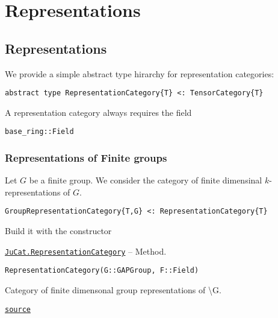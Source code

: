\documentclass{memoir}
\begin{document}
\chapter{Representations}




\hypertarget{5231629623898793339}{}


\section{Representations}



We provide a simple abstract type hirarchy for representation categories:




\begin{lstlisting}
abstract type RepresentationCategory{T} <: TensorCategory{T}
\end{lstlisting}



A representation category always requires the field




\begin{lstlisting}
base_ring::Field
\end{lstlisting}



\hypertarget{9324066174772501507}{}


\subsection{Representations of Finite groups}



Let \(G\) be a finite group. We consider the category of finite dimensinal \(k\)-representations of \(G\).




\begin{lstlisting}
GroupRepresentationCategory{T,G} <: RepresentationCategory{T}
\end{lstlisting}



Build it with the constructor


\hypertarget{9169222131237923867}{} 
\hyperlink{9169222131237923867}{\texttt{JuCat.RepresentationCategory}}  -- {Method.}

\begin{adjustwidth}{2em}{0pt}


\begin{verbatim}
RepresentationCategory(G::GAPGroup, F::Field)
\end{verbatim}

Category of finite dimensonal group representations of {\textbackslash}G.



\href{https://github.com/FabianMaeurer/JuCat.jl/blob/367390e2d003deec2ababa73caeab405e934bb35/src/structures/Representations/GroupRepresentations.jl#L22-L26}{\texttt{source}}


\end{adjustwidth}
\end{document}
